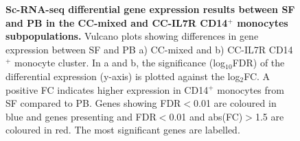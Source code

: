 \begin{figure}[H]
\begin{subfigure}[b]{0.55\textwidth}
\caption{}
\end{subfigure}
\caption[Sc-RNA-seq differential gene expression results between SF and PB in the CC-mixed and CC-IL7R CD14$^+$ monocytes subpopulations.]{\textbf{Sc-RNA-seq differential gene expression results between SF and PB in the CC-mixed and CC-IL7R CD14$^+$ monocytes subpopulations.} Vulcano plots showing differences in gene expression between SF and PB a) CC-mixed and b) CC-IL7R CD14$^+$ monocyte cluster. In a and b, the significance (log${_10}$FDR) of the differential expression (y-axis) is plotted against the log${_2}$FC. A positive FC indicates higher expression in CD14$^+$ monocytes from SF compared to PB. Genes showing FDR$<$0.01 are coloured in blue and genes presenting and FDR$<$0.01 and abs(FC)$>$1.5 are coloured in red. The most significant genes are labelled.}
\label{figure:PsA_scRNAseq_vulcano_plots_mixed_and_IL7R_clusters}
\end{figure}

